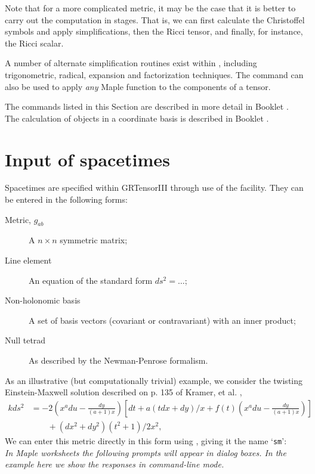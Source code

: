 \documentclass{article}
\begin{document}
{Note that for a more complicated metric, it may be the case that it is
better to carry out the computation in stages. That is, we can first
calculate the Christoffel symbols and apply simplifications, then the
Ricci tensor, and finally, for instance, the Ricci scalar.

A number of alternate simplification routines exist within
, including trigonometric, radical, expansion and
factorization techniques.  The command  can also be used
to apply \textit{any} Maple function to the components of a tensor.

The commands listed in this Section are described in more detail in
Booklet \grCalcRef. The calculation of objects in a coordinate basis
is described in Booklet \grBasisRef.
%
\section{Input of spacetimes}
Spacetimes are specified within GRTensorIII through use of the
 facility. They can be entered in the following forms:
\begin{description}
  \item[Metric, $g_{ab}$] A $n\times n$ symmetric matrix;
  \item[Line element] An equation of the standard form $ds^2 = \ldots$;
  \item[Non-holonomic basis] A set of basis vectors (covariant or
    contravariant) with an inner product;
  \item[Null tetrad] As described by the Newman-Penrose formalism.
\end{description}
As an illustrative (but computationally trivial) example, we consider
the twisting Einstein-Maxwell solution described on p. 135 of Kramer,
et al.  \cite{krameretal},
\begin{align*}
  kds^2 & = -2\left( x^a du - \frac{dy}{(a+1)x}\right)
    \left[ dt + a(t dx + dy)/x + f(t)\left( x^a du - \frac{dy}{(a+1)x}
    \right)\right] \nonumber\\
    & \qquad + (dx^2 + dy^2)(t^2+1)/2x^2,
\end{align*}
We can enter this metric directly in this form using , giving
it the name `\texttt{sm}':\\

\indent\em{In Maple worksheets the following prompts will appear
in dialog boxes. In the example here we show the responses in 
command-line mode.}\\

}
\end{document}

